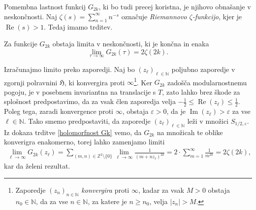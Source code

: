 \documentclass[mat1]{fmfdelo}
\numberwithin{equation}{section}
\newcommand{\R}{\mathbb R}
\newcommand{\N}{\mathbb N}
\newcommand{\Z}{\mathbb Z}
\newcommand{\HH}{\mathfrak{H}}
\newcommand{\abs}[1]{\left\lvert #1 \right\rvert}
\renewcommand\Re{\operatorname{Re}}%
\renewcommand\Im{\operatorname{Im}}%
\theoremstyle{definition}
\begin{document}
\begin{dokaz}
\end{dokaz}



Pomembna lastnost funkcij $G_{2k}$, ki bo tudi precej koristna, je njihovo obnašanje v neskončnosti. Naj $\zeta(s) = \sum_{n = 1}^\infty n^{-s}$ označuje \emph{Riemannovo $\zeta$-funkcijo}, kjer je $\Re(s) > 1$. Tedaj imamo trditev.

\begin{trditev}
    \label{G2k v neskoncnosti}
    Za funkcije $G_{2k}$ obstaja limita v neskončnosti, ki je končna in enaka 
    \[
        \lim_{\tau \to \infty}G_{2k}(\tau) = 2\zeta(2k).  
    \]
\end{trditev}

\begin{dokaz}
    Izračunajmo limito preko zaporedji. Naj bo $(z_\ell)_{\ell\in\N}$ poljubno zaporedje v zgornji polravnini $\HH$, ki konvergira proti $\infty$\footnote{Zaporedje $(z_n)_{n \in \N}$ \emph{konvergira} proti $\infty$, kadar za vsak $M > 0$ obstaja $n_0 \in \N$, da za vse $n \in \N$, za katere je $n \geq n_0$, velja $\abs{z_n} > M$.}. Ker $G_{2k}$ zadošča modularnostnemu pogoju, je v posebnem invariantna na translacije s $T$, zato lahko brez škode za splošnost predpostavimo, da za vsak člen zaporedja velja $-\frac12 \leq \Re(z_\ell) \leq \frac12$. Poleg tega, zaradi konvergence proti $\infty$, obstaja $\varepsilon > 0$, da je $\Im(z_\ell) > \varepsilon$ za vse $\ell \in \N$.  Tako smemo predpostaviti, da zaporedje $(z_\ell)_{\ell \in\N}$ leži v množici $S_{1/2, \varepsilon}$. Iz dokaza trditve \ref{holomorfnost Gk} vemo, da $G_{2k}$ na množicah te oblike konverigra enakomerno, torej lahko zamenjamo limiti
    \begin{gather*}
        \lim_{\ell \to \infty}G_{2k}(z_\ell) = 
        \sum_{(m,n) \in \Z^2\setminus\{0\}} \lim_{\ell \to \infty} \frac{1}{(m + nz_\ell)^{2k}} = 
        2 \cdot \sum_{m = 1}^\infty \frac{1}{m^{2k}} = 2\zeta(2k),
    \end{gather*}
    kar da želeni rezultat.
\end{dokaz}
\end{document}
